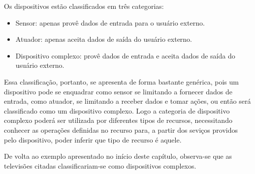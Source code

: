 Os dispositivos estão classificados em três categorias:
\begin{itemize}
	\item Sensor: apenas provê dados de entrada para o usuário externo.
	\item Atuador: apenas aceita dados de saída do usuário externo.
	\item Dispositivo complexo: provê dados de entrada e aceita dados de saída do usuário externo.
\end{itemize}

Essa classificação, portanto, se apresenta de forma bastante genérica, pois um dispositivo pode se enquadrar como sensor se limitando a fornecer dados de entrada, como atuador, se limitando a receber dados e tomar ações, ou então será classificado como um dispositivo complexo. Logo a categoria de dispositivo complexo poderá ser utilizada por diferentes tipos de recursos, necessitando conhecer as operações definidas no recurso para, a partir dos seviços providos pelo dispositivo, poder inferir que tipo de recurso é aquele. 

De volta ao exemplo apresentado no início deste capítulo, observa-se que as televisões citadas classificariam-se como dispositivos complexos.
